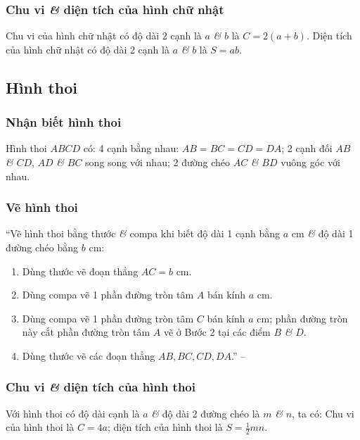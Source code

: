 \documentclass[oneside]{book}
\numberwithin{equation}{section}
\begin{document}
\subsubsection{Chu vi \textit{\&} diện tích của hình chữ nhật}
Chu vi của hình chữ nhật có độ dài 2 cạnh là $a$ \textit{\&} $b$ là $C = 2(a + b)$. Diện tích của hình chữ nhật có độ dài 2 cạnh là $a$ \textit{\&} $b$ là $S = ab$.

\subsection{Hình thoi}

\subsubsection{Nhận biết hình thoi}
Hình thoi $ABCD$ có: 4 cạnh bằng nhau: $AB = BC = CD = DA$; 2 cạnh đối $AB$ \textit{\&} $CD$, $AD$ \textit{\&} $BC$ song song với nhau; 2 đường chéo $AC$ \textit{\&} $BD$ vuông góc với nhau.

\subsubsection{Vẽ hình thoi}
``Vẽ hình thoi bằng thước \textit{\&} compa khi biết độ dài 1 cạnh bằng $a$ cm \textit{\&} độ dài 1 đường chéo bằng $b$ cm:
\begin{enumerate}
	\item Dùng thước vẽ đoạn thẳng $AC = b$ cm.
	\item Dùng compa vẽ 1 phần đường tròn tâm $A$ bán kính $a$ cm.
	\item Dùng compa vẽ 1 phần đường tròn tâm $C$ bán kính $a$ cm; phần đường tròn này cắt phần đường tròn tâm $A$ vẽ ở Bước 2 tại các điểm $B$ \textit{\&} $D$.
	\item Dùng thước vẽ các đoạn thẳng $AB,BC,CD,DA$.'' -- \cite[p. 100]{Thai_Anh_Dat_Ha_Loan_Nam_Quang_Toan_6_tap_1}
\end{enumerate}

\subsubsection{Chu vi \textit{\&} diện tích của hình thoi}
Với hình thoi có độ dài cạnh là $a$ \textit{\&} độ dài 2 đường chéo là $m$ \textit{\&} $n$, ta có: Chu vi của hình thoi là $C = 4a$; diện tích của hình thoi là $S = \frac{1}{2}mn$.

\end{document}
